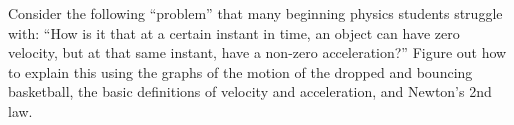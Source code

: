 \label{fnt8.2.1-7}

Consider the following ``problem'' that many beginning physics students struggle with: ``How is it that at a certain instant in time, an object can have zero velocity, but at that same instant, have a non-zero acceleration?''  Figure out how to explain this using the graphs of the motion of the dropped and bouncing basketball, the basic definitions of velocity and acceleration, and Newton's 2nd law.